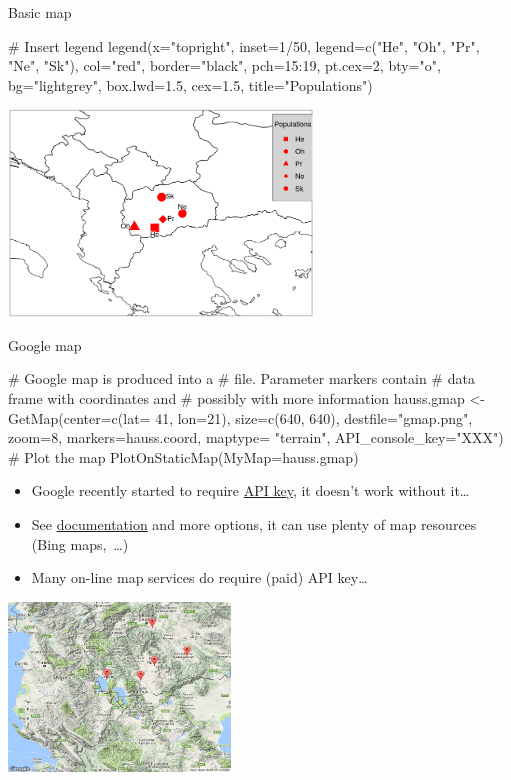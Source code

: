 \documentclass[compress, ucs, xelatex, 11pt, xcolor=svgnames,
	hyperref={
		bookmarks=true,
		unicode=true,
		colorlinks=true,
		pdftitle={Molecular data in R},
		plainpages=false,
		pdfauthor={Vojtech Zeisek},
		pdfsubject={Course about phylogeny and evolution in R},
		pdfcreator={XeLaTeX},
		pdfkeywords={R, evolution, phylogeny, molecular data},
		linkcolor=Tomato,
		anchorcolor=SaddleBrown,
		citecolor=Goldenrod,
		filecolor=DarkMagenta,
		menucolor=Sienna,
		urlcolor=DarkTurquoise,
		pdftex},
	url={hyphens, lowtilde} %
	]{beamer}
\begin{document}
\begin{frame}[fragile]{Basic map}
	\begin{spluscode}
    # Insert legend
    legend(x="topright", inset=1/50, legend=c("He", "Oh", "Pr", "Ne",
      "Sk"), col="red", border="black", pch=15:19, pt.cex=2, bty="o",
      bg="lightgrey", box.lwd=1.5, cex=1.5, title="Populations")
	\end{spluscode}
	\begin{center}
		\includegraphics[height=5.5cm]{map.png}
	\end{center}
\end{frame}

\begin{frame}[fragile]{Google map}
	\begin{multicols}{2}
		\begin{spluscode}
    # Google map is produced into a
    # file. Parameter markers contain
    # data frame with coordinates and
    # possibly with more information
    hauss.gmap <- GetMap(center=c(lat=
      41, lon=21), size=c(640, 640),
      destfile="gmap.png", zoom=8,
      markers=hauss.coord, maptype=
      "terrain", API_console_key="XXX")
    # Plot the map
    PlotOnStaticMap(MyMap=hauss.gmap)
		\end{spluscode}
		\begin{itemize}
			\item Google recently started to require \href{https://developers.google.com/maps/documentation/maps-static/intro}{API key}, it doesn't work without it\ldots
			\item See \href{http://rgooglemaps.r-forge.r-project.org/}{documentation} and more options, it can use plenty of map resources (Bing maps,~\ldots)
			\item Many on-line map services do require (paid) API key\ldots
		\end{itemize}
		\begin{center}
			\includegraphics[height=4.5cm]{gmap1.jpg}
		\end{center}
	\end{multicols}
\end{frame}
\end{document}
